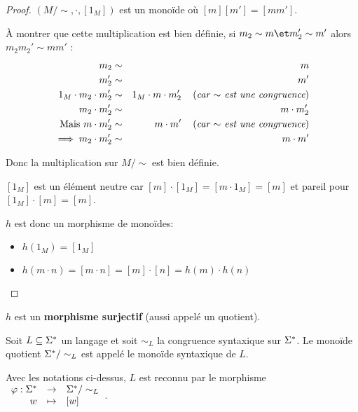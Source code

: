 \begin{proof}
	$(M/\sim, \cdot, [1_M])$ est un monoïde où $[m][m'] = [mm']$.

	À montrer que cette multiplication est bien définie, \cad si $m_2 \sim m \et m_2' \sim m'$ alors $m_2 m_2' \sim m m'$ :
	\begin{eqnarray*}
		m_2 &\sim& m \\
		m_2' &\sim& m' \\
		1_M \cdot  m_2 \cdot m_2' &\sim& 1_M \cdot m \cdot m_2' \quad\left(\textit{car $\sim$ est une congruence}\right) \\
		m_2 \cdot m_2' &\sim&  m \cdot m_2' \\
		\text{Mais } m \cdot m_2' &\sim& m \cdot m' \quad\left(\textit{car $\sim$ est une congruence}\right) \\
		\implies m_2 \cdot m_2' &\sim& m \cdot m'
	\end{eqnarray*}

	Donc la multiplication sur $M/\sim$ est bien définie.


	$[1_M]$ est un élément neutre car $[m]\cdot [1_M] = [m \cdot 1_M] = [m]$ et pareil pour $[1_M]\cdot [m] = [m]$.

	$h$ est donc un morphisme de monoïdes:

	\begin{itemize}
		\item  $h(1_M) = [1_M]$
		\item  $h(m\cdot n) = [m \cdot n] = [m] \cdot [n] = h(m) \cdot h(n)$
	\end{itemize}
\end{proof}

\begin{remarque}
	$h$ est un \textbf{morphisme surjectif} (aussi appelé un quotient).
\end{remarque}

\begin{definition}
	Soit $L \subseteq \Sigma^{*}$ un langage et soit $\sim_L$ la congruence syntaxique sur $\Sigma^{*}$.
	Le monoïde quotient $\Sigma^{*} / \sim_L$ est appelé le monoïde syntaxique de $L$.
\end{definition}

\begin{prop}
	Avec les notations ci-dessus, $L$ est reconnu par le morphisme
	$ \begin{array}{rcl}
			\varphi : \Sigma^{*} & \to     & \Sigma^{*}/\sim_L \\
			w            & \mapsto & [w]
		\end{array} $.
\end{prop}


